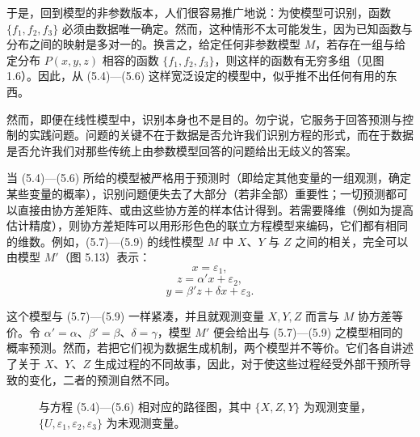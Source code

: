 于是，回到模型的非参数版本，人们很容易推广地说：为使模型可识别，函数 $\{f_1,f_2,f_3\}$ 必须由数据唯一确定。然而，这种情形不太可能发生，因为已知函数与分布之间的映射是多对一的。换言之，给定任何非参数模型 $M$，若存在一组与给定分布 $P(x,y,z)$ 相容的函数 $\{f_1,f_2,f_3\}$，则这样的函数有无穷多组（见图 1.6）。因此，从 \textup{(5.4)}—\textup{(5.6)} 这样宽泛设定的模型中，似乎推不出任何有用的东西。

然而，即便在线性模型中，识别本身也不是目的。勿宁说，它服务于回答预测与控制的实践问题。问题的关键不在于数据是否允许我们识别方程的形式，而在于数据是否允许我们对那些传统上由参数模型回答的问题给出无歧义的答案。

当 \textup{(5.4)}—\textup{(5.6)} 所给的模型被严格用于预测时（即给定其他变量的一组观测，确定某些变量的概率），识别问题便失去了大部分（若非全部）重要性；一切预测都可以直接由协方差矩阵、或由这些协方差的样本估计得到。若需要降维（例如为提高估计精度），则协方差矩阵可以用形形色色的联立方程模型来编码，它们都有相同的维数。例如，\textup{(5.7)}—\textup{(5.9)} 的线性模型 $M$ 中 $X$、$Y$ 与 $Z$ 之间的相关，完全可以由模型 $M'$（图 5.13）表示：
\begin{equation}
x=\varepsilon_1, \tag{5.12}
\end{equation}
\begin{equation}
z=\alpha'x+\varepsilon_2, \tag{5.13}
\end{equation}
\begin{equation}
y=\beta'z+\delta x+\varepsilon_3. \tag{5.14}
\end{equation}

这个模型与 \textup{(5.7)}—\textup{(5.9)} 一样紧凑，并且就观测变量 $X,Y,Z$ 而言与 $M$ 协方差等价。令 $\alpha'=\alpha$、$\beta'=\beta$、$\delta=\gamma$，模型 $M'$ 便会给出与 \textup{(5.7)}—\textup{(5.9)} 之模型相同的概率预测。然而，若把它们视为数据生成机制，两个模型并不等价。它们各自讲述了关于 $X$、$Y$、$Z$ 生成过程的不同故事，因此，对于使这些过程经受外部干预所导致的变化，二者的预测自然不同。

\begin{figure}[htbp]
\centering
{}
\caption{与方程 \textup{(5.4)}—\textup{(5.6)} 相对应的路径图，其中 $\{X,Z,Y\}$ 为观测变量，$\{U,\varepsilon_1,\varepsilon_2,\varepsilon_3\}$ 为未观测变量。}
\label{fig:5.12}
\end{figure}

